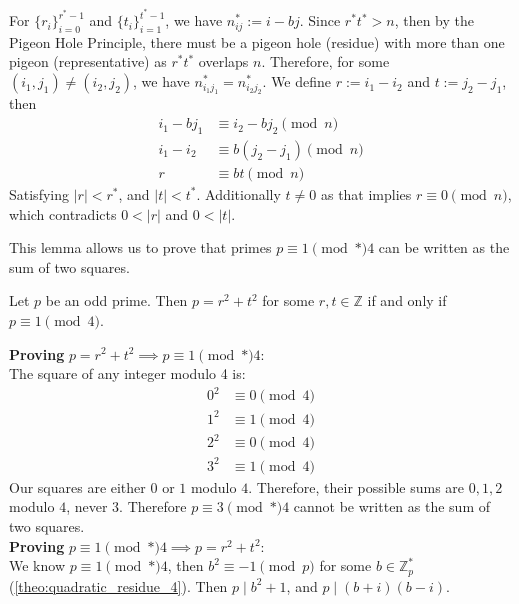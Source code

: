 \newpage
\begin{Proof}

    For $\{r_i\}_{i=0}^{r^*-1}$ and $\{t_i\}_{i=1}^{t^*-1}$, we have $n_{ij}^*:=i-bj$.
    Since $r^*t^* > n$, then by the Pigeon Hole Principle, there must be a pigeon hole (residue) with more than one pigeon (representative) as $r^*t^*$ overlaps $n$.
    Therefore, for some $(i_1,j_1)\neq(i_2,j_2)$, we have $n_{i_1j_1}^*=n_{i_2j_2}^*$. We define $r:=i_1-i_2$ and $t:=j_2-j_1$, then
    \begin{align*}
        i_1-bj_1&\equiv i_2-bj_2\pmod{n}\\
        i_1-i_2&\equiv b(j_2-j_1)\pmod{n}\\
        r&\equiv bt\pmod{n}
    \end{align*}
    \noindent
    Satisfying $|r|<r^*$, and $|t|<t^*$. Additionally $t\neq 0$ as that implies $r\equiv 0\pmod{n}$, which contradicts $0<|r|$ and $0<|t|$.
\end{Proof}
\noindent 
This lemma allows us to prove that primes $p \equiv 1 \pmod*{4}$ can be written as the sum of two squares.
\begin{theo}

    Let $p$ be an odd prime. Then $p=r^2+t^2$ for some $r,t\in\mathbb{Z}$ if and only if $p\equiv 1\pmod{4}$.
\end{theo}
\begin{Proof}

    \textbf{Proving} $p=r^2+t^2\implies p\equiv 1\pmod*{4}$:\\
    \noindent
    The square of any integer modulo 4 is:
    \begin{align*}
        0^2 &\equiv 0\pmod{4} \\
        1^2 &\equiv 1\pmod{4} \\
        2^2 &\equiv 0\pmod{4} \\
        3^2 &\equiv 1\pmod{4}
    \end{align*}
    \noindent
    Our squares are either $0$ or $1$ modulo $4$. Therefore, their possible sums are $0,1,2$ modulo $4$, never $3$.
    Therefore $p\equiv 3\pmod*{4}$ cannot be written as the sum of two squares.\\

    \noindent
    \textbf{Proving} $p\equiv 1\pmod*{4}\implies p=r^2+t^2$:\\

    \noindent
    We know $p\equiv 1\pmod*{4}$, then $b^2\equiv -1\pmod{p}$ for some $b\in\mathbb{Z}_p^*$ (\ref{theo:quadratic_residue_4}). Then $p\mid b^2+1$, and $p\mid (b+i)(b-i)$.

\end{Proof}

